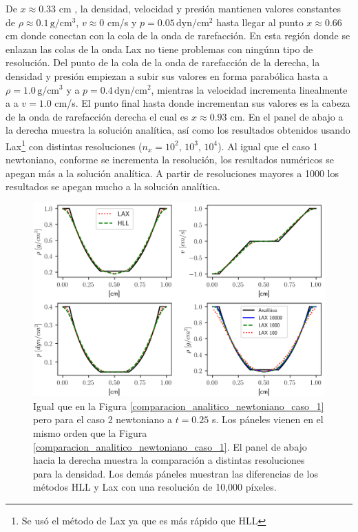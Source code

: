 \documentclass[12pt,a4paper]{book}
\begin{document}
De $x \approx 0.33$ cm , la densidad, velocidad y presión 
mantienen valores constantes de $\rho \approx 0.1 \,  \text{g}/ \text{cm}^3$, $v \approx 0$ cm/s y 
$p = 0.05 \,  \text{dyn}/ \text{cm}^2 $ 
hasta llegar al punto $x \approx 0.66$ cm donde conectan con la cola de la onda de rarefacción. En
esta región donde se enlazan las colas de la onda Lax no tiene problemas con ningúnn tipo de resolución.
Del punto de la cola de la onda de rarefacción de la derecha, la densidad y presión empiezan a subir 
sus valores en forma parabólica hasta a $\rho  =  1.0 \,  \text{g}/ \text{cm}^3 $ y 
a $p = 0.4 \,  \text{dyn}/ \text{cm}^2 $, 
mientras la velocidad incrementa
linealmente a a $v = 1.0$ cm/s. El punto final hasta donde incrementan sus valores es la cabeza de la onda 
de rarefacción derecha el cual es $ x \approx 0.93 $ cm.
En el panel de abajo a la derecha muestra la solución analítica, así como los resultados obtenidos 
usando Lax\footnote{
  Se usó el método de Lax ya que es más rápido que HLL
}
con distintas resoluciones ($n_x = 10^2, \, 10^3, \,10^4$). Al igual que el caso 1 newtoniano,
conforme se incrementa la resolución, los resultados numéricos se apegan más a la solución analítica.
A partir de resoluciones mayores a 1000 los resultados se apegan mucho a la solución analítica.




\begin{figure}
  \centering
    \includegraphics[width=1.0\textwidth]{./Figuras/verificacion_del_codigo/rarefaction-rarefaction.png}
  \caption{ Igual que en la Figura \ref{comparacion_analitico_newtoniano_caso_1} pero para el 
  caso 2 newtoniano a $t = 0.25$ s. Los páneles vienen en 
  el mismo orden que la Figura \ref{comparacion_analitico_newtoniano_caso_1}.
  El panel de abajo hacia la derecha muestra la comparación a distintas resoluciones para la densidad. 
  Los demás páneles muestran las diferencias de los métodos HLL y Lax con una resolución 
  de 10,000 píxeles.
  \label{comparacion_analitico_newtoniano_caso_2}} 
\end{figure}
\end{document}
